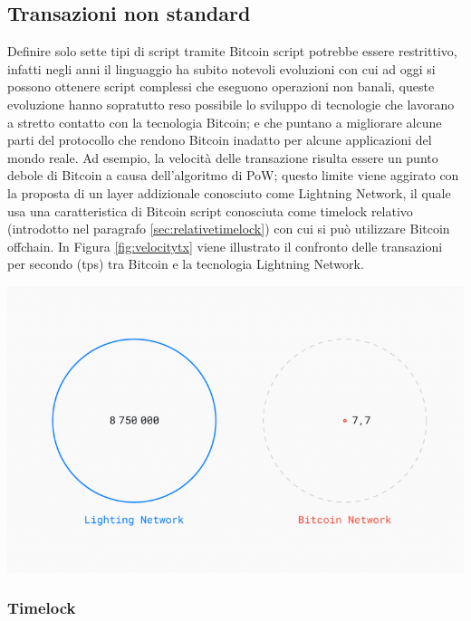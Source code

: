 \subsection{Transazioni non standard}
Definire solo sette tipi di script tramite Bitcoin script potrebbe essere restrittivo, infatti negli anni il linguaggio ha subito notevoli evoluzioni con cui ad oggi si possono ottenere script complessi che eseguono operazioni non banali, queste evoluzione hanno sopratutto reso possibile lo sviluppo di tecnologie che lavorano a stretto contatto con la tecnologia Bitcoin; e che puntano a migliorare alcune parti del protocollo che rendono Bitcoin inadatto per alcune applicazioni del mondo reale. Ad esempio, la velocità delle transazione risulta essere un punto debole di Bitcoin a causa dell’algoritmo di PoW; questo limite viene aggirato con la proposta di un layer addizionale conosciuto come Lightning Network, il quale usa una caratteristica di Bitcoin script conosciuta come timelock relativo (introdotto nel paragrafo \ref{sec:relativetimelock}) con cui si può utilizzare Bitcoin offchain.
In Figura \ref{fig:velocitytx} viene illustrato il confronto delle transazioni per secondo (tps) tra Bitcoin e la tecnologia Lightning Network.

{\centering
\includegraphics[scale=0.35]{images/Lightning-Network-study.png}
\par}

\subsubsection{Timelock}

